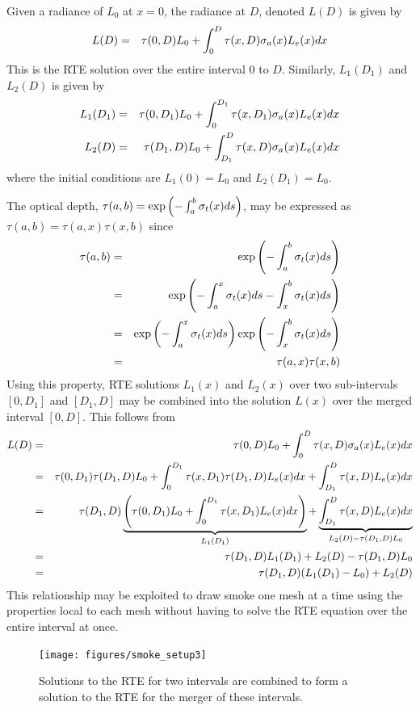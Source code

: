 Given a radiance of $L_0$ at $x=0$, the radiance at $D$, denoted $L(D)$ is given by
\begin{eqnarray}
\label{eq:rtesoln}
L(D)&=&\tau(0,D)L_0 + \int_0^D\tau(x,D)\sigma_a(x)L_e(x) dx
\end{eqnarray}
This is the RTE solution over the entire interval $0$ to $D$.
Similarly, $L_1(D_1)$ and $L_2(D)$ is given by
\begin{eqnarray*}
L_1(D_1)&=&\tau(0,D_1)L_0 + \int_0^{D_1}\tau(x,D_1)\sigma_a(x)L_e(x) dx\\
L_2(D)&=&\tau(D_1,D)L_0 + \int_{D_1}^{D}\tau(x,D)\sigma_a(x)L_e(x) dx
\end{eqnarray*}
where the initial conditions are $L_1(0)=L_0$ and $L_2(D_1)=L_0$.

The optical depth, $\tau(a,b)=\exp\left(-\int_a^b \sigma_t(x) ds\right)$, may be expressed as $\tau(a,b)=\tau(a,x)\tau(x,b)$ since
\begin{eqnarray*}
\tau(a,b)&=&\exp\left(-\int_a^b \sigma_t(x) ds\right)\\
&=&\exp\left(-\int_a^x \sigma_t(x) ds -\int_x^b \sigma_t(x) ds\right)\\
&=&\exp\left(-\int_a^x \sigma_t(x) ds\right)\exp\left(-\int_x^b \sigma_t(x) ds\right)\\
&=&\tau(a,x)\tau(x,b)
\end{eqnarray*}
Using this property, RTE solutions $L_1(x)$ and $L_2(x)$ over two sub-intervals $[0,D_1]$ and $[D_1,D]$ may be combined into the solution $L(x)$ over the merged
interval $[0,D]$.  This follows from
\begin{eqnarray*}
L(D)&=&\tau(0,D)L_0 + \int_0^D\tau(x,D)\sigma_a(x)L_e(x) dx\\
&=&\tau(0,D_1)\tau(D_1,D)L_0 + \int_0^{D_1}\tau(x,D_1)\tau(D_1,D)L_e(x) dx + \int_{D_1}^{D}\tau(x,D)L_e(x) dx\\
&=&\tau(D_1,D)
\underbrace{\left(\tau(0,D_1)L_0 + \int_0^{D_1}\tau(x,D_1)L_e(x) dx\right)}_{L_1(D_1)} +
\underbrace{\int_{D_1}^{D}\tau(x,D)L_e(x) dx}_{L_2(D)-\tau(D_1,D)L_0}\\
&=&\tau(D_1,D)L_1(D_1)+L_2(D)-\tau(D_1,D)L_0\\
&=&\tau(D_1,D)(L_1(D_1)-L_0) + L_2(D)
\end{eqnarray*}
This relationship may be exploited to draw smoke one mesh at a time using the properties local to each mesh without having to solve the RTE equation over the entire interval at once.

\begin{figure}[\figoptions]
\begin{center}
\texttt{[image: figures/smoke\_setup3]}
\end{center}
\caption {Solutions to the RTE for two intervals are combined to form a solution to the RTE
for the merger of these intervals.
}
\label{figsmokesetup3}
\end{figure}

